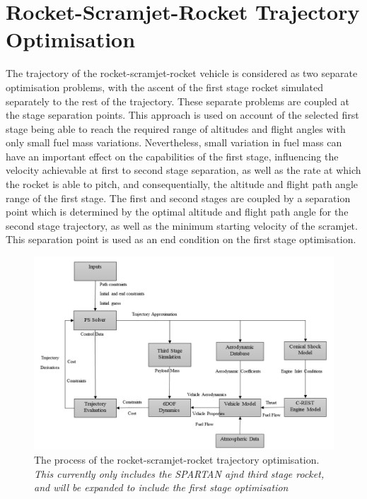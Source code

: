 \section{Rocket-Scramjet-Rocket Trajectory Optimisation}

The trajectory of the rocket-scramjet-rocket vehicle is considered as two separate optimisation problems, with the ascent of the first stage rocket simulated separately to the rest of the trajectory. These separate problems are coupled at the stage separation points.
This approach is used on account of the selected first stage being able to reach the required range of altitudes and flight angles with only small fuel mass variations. 
Nevertheless, small variation in fuel mass can have an important effect on the capabilities of the first stage, influencing the velocity achievable at first to second stage separation, as well as the rate at which the rocket is able to pitch, and consequentially, the altitude and flight path angle range of the first stage.
The first and second stages are coupled by a separation point which is determined by the optimal altitude and flight path angle for the second stage trajectory, as well as the minimum starting velocity of the scramjet. This separation point is used as an end condition on the first stage optimisation.


\begin{landscape}%
	\begin{figure}[ht]
		\centering
		\includegraphics[width=0.9\linewidth]{"figures/4_LODESTAR/Ascent Flowchart"}
		\caption{The process of the rocket-scramjet-rocket trajectory optimisation. \textit{This currently only includes the SPARTAN ajnd third stage rocket, and will be expanded to include the first stage optimisation}}
		\label{fig:AscentFlowchart}
	\end{figure} 
\end{landscape}



